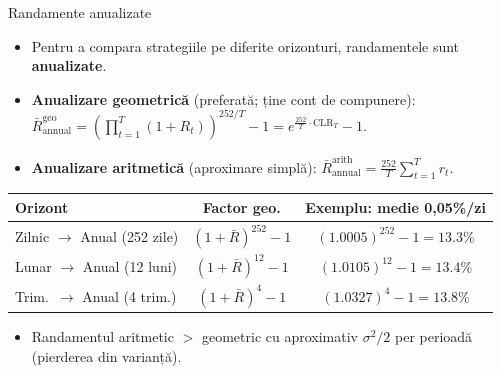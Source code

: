 \documentclass[9pt, aspectratio=169, t]{beamer}
\theoremstyle{definition}
\begin{document}
\begin{frame}{Randamente anualizate}
\begin{itemize}\small\setlength{\itemsep}{1pt}
    \item Pentru a compara strategiile pe diferite orizonturi, randamentele sunt \textbf{anualizate}.
    \item \textbf{Anualizare geometrică} (preferată; ține cont de compunere):
    $\bar{R}_{\text{annual}}^{\text{geo}} = \left(\prod_{t=1}^{T}(1+R_t)\right)^{252/T} - 1 = e^{\frac{252}{T}\cdot\text{CLR}_T} - 1.$
    \item \textbf{Anualizare aritmetică} (aproximare simplă):
    $\bar{R}_{\text{annual}}^{\text{arith}} = \frac{252}{T}\sum_{t=1}^{T} r_t.$
\end{itemize}
\vspace{0.05cm}
\begin{center}
{\footnotesize
\renewcommand{\arraystretch}{1.15}
\begin{tabular}{lcc}
\toprule
\textbf{Orizont} & \textbf{Factor geo.} & \textbf{Exemplu: medie 0,05\%/zi} \\
\midrule
Zilnic $\to$ Anual (252 zile) & $(1+\bar{R})^{252}-1$ & $(1.0005)^{252}-1 = 13.3\%$ \\
Lunar $\to$ Anual (12 luni) & $(1+\bar{R})^{12}-1$ & $(1.0105)^{12}-1 = 13.4\%$ \\
Trim.\ $\to$ Anual (4 trim.) & $(1+\bar{R})^{4}-1$ & $(1.0327)^{4}-1 = 13.8\%$ \\
\bottomrule
\end{tabular}
}
\end{center}
\vspace{0.05cm}
\begin{itemize}\small
    \item Randamentul aritmetic $>$ geometric cu aproximativ $\sigma^2/2$ per perioadă (pierderea din varianță).
\end{itemize}
\end{frame}
\end{document}
